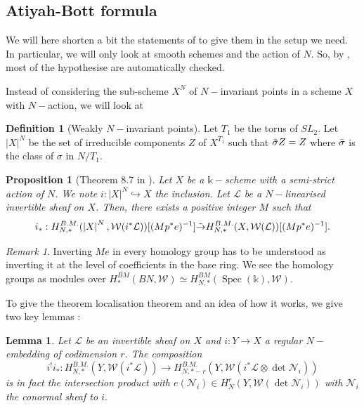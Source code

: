 \documentclass{amsart}
\theoremstyle{plain}%
\newtheorem{lemme}[subsubsection]{Lemma}
\newtheorem{prop}[subsubsection]{Proposition}
\theoremstyle{remark}
\newtheorem{rmq}[subsubsection]{Remark}
\theoremstyle{definition}
\newtheorem{deff}[subsubsection]{Definition}
\newcommand{\cL}{\mathcal{L}}
\newcommand{\cN}{\mathscr{N}}
\newcommand{\cW}{\mathcal{W}}
\newcommand{\ek}{\mathbb{k}}
\newcommand{\isomr}{\Tilde{\to}}
\newcommand{\Spec}[1]{\operatorname{Spec}\left(#1\right)}
\newcommand{\vabs}[1]{\left| #1\right|}
\begin{document}
\subsection{Atiyah-Bott formula}
We will here shorten a bit the statements of \cite{LevineAB24} to give them in the setup we need. In particular, we will only look at smooth schemes and the action of $N.$ So, by \cite[Remark 9.6]{LevineAB24}, most of the hypothesise are automatically checked.

Instead of considering the sub-scheme $X^N$ of $N-$invariant points in a scheme $X$ with $N-$action, we will look at

\begin{deff}[Weakly $N-$invariant points]\label{DEF - points invariants pour N}
Let $T_1$ be the torus of $SL_2$. Let $\vabs{X}^N$ be the set of irreducible components $Z$ of $X^{T_1}$ such that $\Bar{\sigma}Z = Z$ where $\Bar{\sigma}$ is the class of $\sigma$ in $N/T_1$.
\end{deff}

\begin{prop}[Theorem 8.7 in \cite{LevineAB24}]\label{PROP - atiyah-bott loc}
Let $X$ be a $\ek-$scheme with a semi-strict action of $N$. We note $i : \vabs{X}^N \hookrightarrow X$ the inclusion. Let $\cL$ be a $N-$linearised invertible sheaf on $X$. Then, there exists a positive integer $M$ such that 
\[i_\ast : H^{B.M.}_{N,\ast}(\vabs{X}^N,\cW(i^\ast \cL))[(Mp^\ast e)^{-1}] \isomr H^{B.M.}_{N,\ast}(X,\cW(\cL))[(Mp^\ast e)^{-1}].\]
\end{prop}

\begin{rmq}
Inverting $Me$ in every homology group has to be understood as inverting it at the level of coefficients in the base ring. We see the homology groups as modules over $H^{BM}_\ast(BN,\cW) \simeq H^{BM}_{N,\ast}(\Spec{\ek},\cW).$
\end{rmq}

To give the theorem localisation theorem and an idea of how it works, we give two key lemmas \cite[Lemma 9.1 and 9.3]{LevineAB24}:

\begin{lemme}\label{LEM - triangle commutatif produit classe Euler}
Let $\cL$ be an invertible sheaf on $X$ and $i : Y \to X$ a regular $N-$embedding of codimension $r$. The composition
\[i^!i_\ast : H^{B.M.}_{N,\ast}(Y,\cW(i^\ast \cL)) \to H^{B.M.}_{N,\ast-r}(Y,\cW(i^\ast \cL\otimes \det \cN_i))\]
is in fact the intersection product with $e(\cN_i) \in H^r _N(Y,\cW(\det \cN_i))$ with $\cN_i$ the conormal sheaf to $i.$
\end{lemme}
\end{document}
